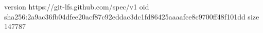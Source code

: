 version https://git-lfs.github.com/spec/v1
oid sha256:2a9ac36fb04dfee20acf87c92eddac3dc1fd86425aaaafce8c9700ff48f101dd
size 147787
